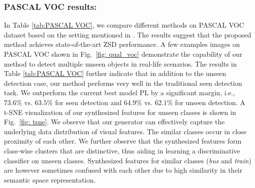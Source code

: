 \documentclass[runningheads]{llncs}
\begin{document}
\subsubsection{PASCAL VOC results:} In Table \ref{tab:PASCAL VOC}, we compare different methods on PASCAL VOC dataset based on the setting mentioned in \cite{demirel2018zero}. The results suggest that the proposed method achieves state-of-the-art ZSD performance. A few examples images on PASCAL VOC shown in Fig.~\ref{fig: qual_voc} demonstrate the capability of our method to detect multiple unseen objects in real-life scenarios. The results in Table \ref{tab:PASCAL VOC} further indicate that in addition to the unseen detection case, our method performs very well in the traditional seen detection task. We outperform the current best model PL \cite{rahman2018polarity} by a significant margin, i.e., $73.6\%$ vs. $63.5\%$ for seen detection and $64.9\%$ vs. $62.1\%$ for unseen detection. A t-SNE visualization of our synthesized features for unseen classes is shown in Fig.~\ref{fig: tsne}. We observe that our generator can effectively capture the underlying data distribution of visual features. The similar classes occur in close proximity of each other. We further observe that the synthesized features form class-wise clusters that are distinctive, thus aiding in learning a discriminative classifier on unseen classes. Synthesized features for similar classes (\emph{bus} and \emph{train}) are however sometimes confused with each other due to high similarity in their semantic space representation.
\end{document}
